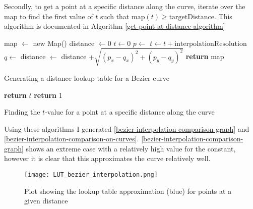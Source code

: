     Secondly, to get a point at a specific distance along the curve, iterate over the map to find the first value of $t$ such that $\text{map}(t) \geq \text{targetDistance}$. This algorithm is documented in Algorithm \ref{get-point-at-distance-algorithm}

    \begin{algorithm}
        \begin{algorithmic}
            \State map $\gets$ new Map()
            \State distance $\gets 0$
            \State $t \gets 0$
                \State {}
                \State $p \gets$ 
                \State $t \gets t + \text{interpolationResolution}$
                \State $q \gets$ 
                \State distance $\gets$ distance $+ \sqrt{(p_x - q_x)^2 + (p_y - q_y)^2}$
            \EndWhile
            \State \textbf{return} map
        \end{algorithmic}
        \caption{Generating a distance lookup table for a Bezier curve}
        \label{generate-lookup-algorithm}
    \end{algorithm}

    \begin{algorithm}
        \begin{algorithmic}
                        \State \textbf{return} $t$
                    \EndIf
                \EndFor
                \State \textbf{return} 1
            \EndFunction
        \end{algorithmic}
        \caption{Finding the $t$-value for a point at a specific distance along the curve}
        \label{get-point-at-distance-algorithm}
    \end{algorithm}

    Using these algorithms I generated \autoref{bezier-interpolation-comparison-graph} and \autoref{bezier-interpolation-comparison-on-curves}. \autoref{bezier-interpolation-comparison-graph} shows an extreme case with a relatively high value for the  constant, however it is clear that this approximates the curve relatively well.

    \begin{figure}
        \centering
        \texttt{[image: LUT\_bezier\_interpolation.png]}
        \caption{Plot showing the lookup table approximation (blue) for points at a given distance}
        \label{bezier-interpolation-comparison-graph}
    \end{figure}

